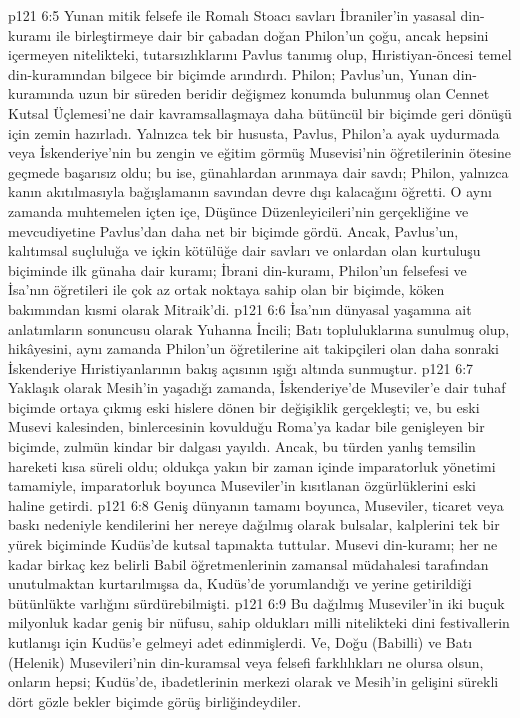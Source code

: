 \vs p121 6:5 Yunan mitik felsefe ile Romalı Stoacı savları İbraniler’in yasasal din\hyp{}kuramı ile birleştirmeye dair bir çabadan doğan Philon’un çoğu, ancak hepsini içermeyen nitelikteki, tutarsızlıklarını Pavlus tanımış olup, Hıristiyan\hyp{}öncesi temel din\hyp{}kuramından bilgece bir biçimde arındırdı. Philon; Pavlus’un, Yunan din\hyp{}kuramında uzun bir süreden beridir değişmez konumda bulunmuş olan Cennet Kutsal Üçlemesi’ne dair kavramsallaşmaya daha bütüncül bir biçimde geri dönüşü için zemin hazırladı. Yalnızca tek bir hususta, Pavlus, Philon’a ayak uydurmada veya İskenderiye’nin bu zengin ve eğitim görmüş Musevisi’nin öğretilerinin ötesine geçmede başarısız oldu; bu ise, günahlardan arınmaya dair savdı; Philon, yalnızca kanın akıtılmasıyla bağışlamanın savından devre dışı kalacağını öğretti. O aynı zamanda muhtemelen içten içe, Düşünce Düzenleyicileri’nin gerçekliğine ve mevcudiyetine Pavlus’dan daha net bir biçimde gördü. Ancak, Pavlus’un, kalıtımsal suçluluğa ve içkin kötülüğe dair savları ve onlardan olan kurtuluşu biçiminde ilk günaha dair kuramı; İbrani din\hyp{}kuramı, Philon’un felsefesi ve İsa’nın öğretileri ile çok az ortak noktaya sahip olan bir biçimde, köken bakımından kısmi olarak Mitraik’di.
\vs p121 6:6 İsa’nın dünyasal yaşamına ait anlatımların sonuncusu olarak Yuhanna İncili; Batı topluluklarına sunulmuş olup, hikâyesini, aynı zamanda Philon’un öğretilerine ait takipçileri olan daha sonraki İskenderiye Hıristiyanlarının bakış açısının ışığı altında sunmuştur.
\vs p121 6:7 Yaklaşık olarak Mesih’in yaşadığı zamanda, İskenderiye’de Museviler’e dair tuhaf biçimde ortaya çıkmış eski hislere dönen bir değişiklik gerçekleşti; ve, bu eski Musevi kalesinden, binlercesinin kovulduğu Roma’ya kadar bile genişleyen bir biçimde, zulmün kindar bir dalgası yayıldı. Ancak, bu türden yanlış temsilin hareketi kısa süreli oldu; oldukça yakın bir zaman içinde imparatorluk yönetimi tamamiyle, imparatorluk boyunca Museviler’in kısıtlanan özgürlüklerini eski haline getirdi.
\vs p121 6:8 Geniş dünyanın tamamı boyunca, Museviler, ticaret veya baskı nedeniyle kendilerini her nereye dağılmış olarak bulsalar, kalplerini tek bir yürek biçiminde Kudüs’de kutsal tapınakta tuttular. Musevi din\hyp{}kuramı; her ne kadar birkaç kez belirli Babil öğretmenlerinin zamansal müdahalesi tarafından unutulmaktan kurtarılmışsa da, Kudüs’de yorumlandığı ve yerine getirildiği bütünlükte varlığını sürdürebilmişti.
\vs p121 6:9 Bu dağılmış Museviler’in iki buçuk milyonluk kadar geniş bir nüfusu, sahip oldukları milli nitelikteki dini festivallerin kutlanışı için Kudüs’e gelmeyi adet edinmişlerdi. Ve, Doğu (Babilli) ve Batı (Helenik) Musevileri’nin din\hyp{}kuramsal veya felsefi farklılıkları ne olursa olsun, onların hepsi; Kudüs’de, ibadetlerinin merkezi olarak ve Mesih’in gelişini sürekli dört gözle bekler biçimde görüş birliğindeydiler.
